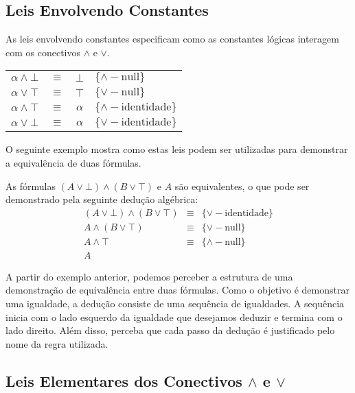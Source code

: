 \subsection{Leis Envolvendo Constantes}

As leis envolvendo constantes especificam como as constantes lógicas
interagem com os conectivos $\land$ e $\lor$.

\begin{table}[h]
    \begin{tabular}{|cccl|}
        \hline
             $\alpha \land \bot$ & $\equiv$ & $\bot$ &
             $\{\land-\text{null}\}$\\
             $\alpha \lor \top$ & $\equiv$ & $\top$ &
             $\{\lor-\text{null}\}$\\
             $\alpha \land \top$ & $\equiv$ & $\alpha$ & $\{\land-\text{identidade}\}$\\
             $\alpha \lor \bot$ & $\equiv$ & $\alpha$ & $\{\lor-\text{identidade}\}$\\
        \hline
    \end{tabular}
    \centering
\end{table}

O seguinte exemplo mostra como estas leis podem ser utilizadas para
demonstrar a equivalência de duas fórmulas.

\begin{Example}
As fórmulas $(A \lor \bot)\land(B \lor \top)$ e $A$ são
equivalentes, o que pode ser demonstrado pela seguinte dedução
algébrica:
\[
\begin{array}{lcl}
(A \lor \bot)\land(B \lor \top) & \equiv &\{\lor-\text{identidade}\} \\
A \land (B\lor \top) & \equiv & \{\lor-\text{null}\}\\
A \land \top & \equiv & \{\land-\text{null}\}\\
A & &
\end{array}
\]
\end{Example}

A partir do exemplo anterior, podemos perceber a estrutura de uma
demonstração de equivalência entre duas fórmulas. Como o objetivo é
demonstrar uma igualdade, a dedução consiste de uma sequência de
igualdades. A sequência inicia com o lado esquerdo da igualdade que
desejamos deduzir e termina com o lado direito. Além disso, perceba
que cada passo da dedução é justificado pelo nome da regra utilizada.


\subsection{Leis Elementares dos Conectivos $\land$ e $\lor$}


